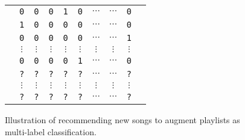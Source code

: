 \begin{figure}[!h]
\centering
\setlength{\tabcolsep}{1pt} %
\begin{tabular}{|*{10}{c}|} \hline
\rule{0em}{10pt}
& \texttt{0} & \texttt{0} & \texttt{0} & \texttt{1} & \texttt{0} & $\cdots$ & $\cdots$ & \texttt{0} & \\
& \texttt{1} & \texttt{0} & \texttt{0} & \texttt{0} & \texttt{0} & $\cdots$ & $\cdots$ & \texttt{0} & \\
\vspace{-5pt}
& \texttt{0} & \texttt{0} & \texttt{0} & \texttt{0} & \texttt{0} & $\cdots$ & $\cdots$ & \texttt{1} & \\
& $\vdots$ & $\vdots$ & $\vdots$ & $\vdots$ & $\vdots$ & $\vdots$ & $\vdots$ & $\vdots$ & \\
& \texttt{0} & \texttt{0} & \texttt{0} & \texttt{0} & \texttt{1} & $\cdots$ & $\cdots$ & \texttt{0} & \\ \hline
\rowcolor{gray!20}
\vspace{-5pt}
& \texttt{?} & \texttt{?} & \texttt{?} & \texttt{?} & \texttt{?} & $\cdots$ & $\cdots$ & \texttt{?} & \rule{0em}{10pt} \\
\rowcolor{gray!20}
& $\vdots$ & $\vdots$ & $\vdots$ & $\vdots$ & $\vdots$ & $\vdots$ & $\vdots$ & $\vdots$ &  \\
\rowcolor{gray!20}
& \texttt{?} & \texttt{?} & \texttt{?} & \texttt{?} & \texttt{?} & $\cdots$ & $\cdots$ & \texttt{?} & \\ \hline
\end{tabular}
\caption{Illustration of recommending new songs to augment playlists as multi-label classification.}
\label{fig:mlr}
\end{figure}

